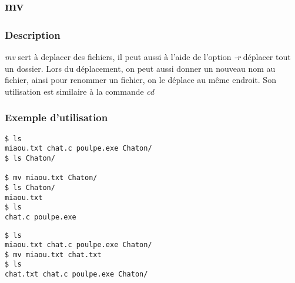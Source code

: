 \subsection*{mv}
\subsubsection*{Description}
\emph{mv} sert à deplacer des fichiers, il peut aussi à l'aide de l'option \emph{-r} déplacer tout un dossier.
Lors du déplacement, on peut aussi donner un nouveau nom au fichier, ainsi pour renommer un fichier, on le déplace au même endroit.
Son utilisation est similaire à la commande \emph{cd}

\subsubsection*{Exemple d'utilisation}

\begin{lstlisting}[caption=déplacement d'un fichier]
$ ls
miaou.txt chat.c poulpe.exe Chaton/
$ ls Chaton/

$ mv miaou.txt Chaton/
$ ls Chaton/
miaou.txt
$ ls
chat.c poulpe.exe
\end{lstlisting}

\begin{lstlisting}[caption=renommer un fichier]
$ ls
miaou.txt chat.c poulpe.exe Chaton/
$ mv miaou.txt chat.txt
$ ls
chat.txt chat.c poulpe.exe Chaton/
\end{lstlisting}
